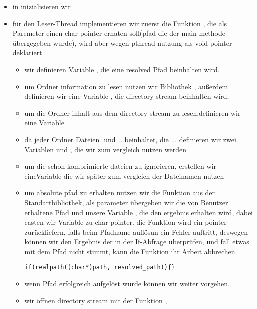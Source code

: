 \begin{itemize}
	\item in  inizialisieren wir 
	\item für den Leser-Thread implementieren wir zuerst die Funktion ,
	die als Paremeter einen char pointer erhaten soll(pfad die der main methode übergegeben wurde),
	wird aber wegen pthread nutzung als void pointer deklariert.
	\begin{itemize}
		\item wir definieren Variable ,
		die eine resolved Pfad beinhalten wird.
		\item um Ordner information zu lesen nutzen wir Bibliothek ,
		außerdem definieren wir eine Variable  , die directory stream beinhalten wird.
		\item um die Ordner inhalt aus dem directory stream zu lesen,definieren wir eine Variable
		\item da jeder Ordner Dateien \textit{.}und \textit{..} beinhaltet, die ...
		definieren wir zwei Variablen  und ,
		die wir zum vergleich nutzen werden
		\item um die schon komprimierte dateien zu ignorieren, erstellen wir eineVariable 
		die wir später zum vergleich der Dateinamen nutzen
		\item um absolute pfad zu erhalten nutzen wir die Funktion  aus der Standartbibliothek,
		als parameter übergeben wir die von Benutzer erhaltene Pfad 
		und unsere Variable , die den ergebnis erhalten wird,
		dabei casten wir Variable  zu char pointer.
		die Funktion wird ein  pointer zurückliefern, falls beim Pfadname auflösun ein Fehler auftritt,
		deswegen können wir den Ergebnis der  in der If-Abfrage überprüfen,
		und fall etwas mit dem Pfad nicht stimmt, kann die Funktion  ihr Arbeit abbrechen.
	\begin{lstlisting}
if(realpath((char*)path, resolved_path)){}
	\end{lstlisting}
		\item wenn Pfad erfolgreich aufgelöst wurde können wir weiter vorgehen.
		\item wir öffnen directory stream mit der Funktion ,

\end{itemize}
\end{itemize}
